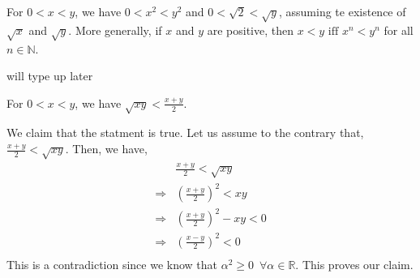 \documentclass{scrartcl}
\newcommand{\rn}{\mathbb{R}}
\newcommand{\nn}{\mathbb{N}}
\begin{document}
    \begin{example}
        For $0 < x < y$, we have $0<x^2<y^2$ and $0<\sqrt{2}<\sqrt{y}$, assuming te existence of $\sqrt{x}$ and $\sqrt{y}$. More generally, if $x$ and $y$ are positive, then $x < y \text{ iff } x^n < y^n$ for all $n \in \nn$.
		\begin{proof*}
            will type up later
		\end{proof*}
    \end{example}
    \begin{example}
        For $0 < x < y$, we have $\sqrt{xy} < \frac{x + y}{2}$.
        \begin{proof*}
            We claim that the statment is true. Let us assume to the contrary that, $\frac{x + y}{2} < \sqrt{xy}$. Then, we have, 
            \begin{align*}
			    &\frac{x + y}{2} < \sqrt{xy} \\
			    \Rightarrow &\left(\frac{x + y}{2}\right)^2 < xy \tag{Example 1}\\
			    \Rightarrow &\left(\frac{x + y}{2}\right)^2 - xy < 0 \\
			    \Rightarrow &\left(\frac{x - y}{2}\right)^2 < 0 \\
		    \end{align*}
		    This is a contradiction since we know that $\alpha^2 \geq 0 \,\,\, \forall \alpha \in \rn$. This proves our claim.
        \end{proof*}
    \end{example}
\end{document}
